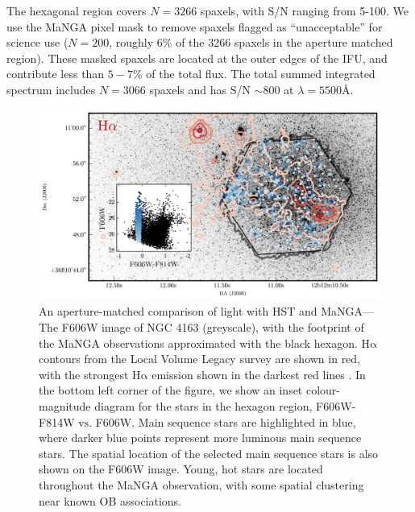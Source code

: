 \documentclass[preprint2]{aastex62}
\newcommand\vs{\ensuremath{\mathrm{vs.}}\xspace}
\newcommand{\ha}{\ensuremath{\mathrm{H\alpha}}\xspace}
\newcommand{\ang}{\ensuremath{\mbox{\AA}}\xspace}
\begin{document}
The hexagonal region covers $N=3266$ spaxels, with S/N ranging from 5-100. We use the MaNGA pixel mask to remove spaxels flagged as ``unacceptable'' for science use ($N=200$, roughly 6\% of the 3266 spaxels in the aperture matched region). These masked spaxels are located at the outer edges of the IFU, and contribute less than $5-7$\% of the total flux. The total summed integrated spectrum includes $N=3066$ spaxels and has S/N $\sim800$ at $\lambda=5500\ang$. 

\begin{figure}
  \begin{center}
    \includegraphics[width=\linewidth]{figs/f1.png}
    \caption{{\sc An aperture-matched comparison of light with HST and MaNGA---} The F606W image of NGC 4163 (greyscale), with the footprint of the MaNGA observations approximated with the black hexagon. \ha contours from the Local Volume Legacy survey are shown in red, with the strongest \ha emission shown in the darkest red lines \citep{Kennicutt+2008}. In the bottom left corner of the figure, we show an inset colour-magnitude diagram for the stars in the hexagon region, F606W-F814W \vs F606W. Main sequence stars are highlighted in blue, where darker blue points represent more luminous main sequence stars. The spatial location of the selected main sequence stars is also shown on the F606W image. Young, hot stars are located throughout the MaNGA observation, with some spatial clustering near known OB associations.}
    \label{fig:FOV}
  \end{center}
\end{figure}
\end{document}
